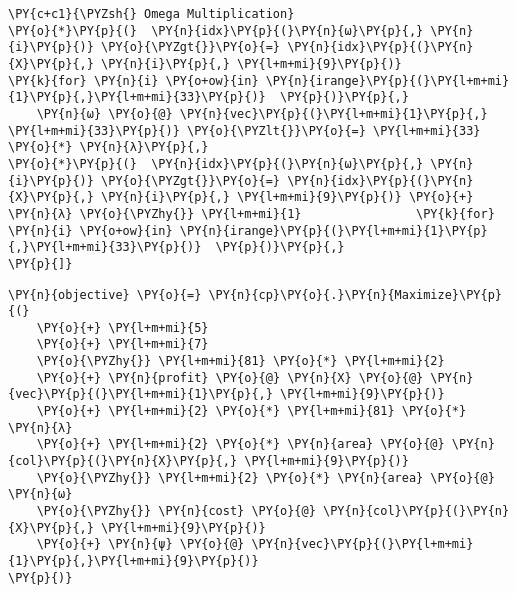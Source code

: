 \begin{tcolorbox}[breakable, size=fbox, boxrule=1pt, pad at break*=1mm,colback=cellbackground, colframe=cellborder]
\begin{Verbatim}[commandchars=\\\{\}]
    \PY{c+c1}{\PYZsh{} Omega Multiplication}
\PY{o}{*}\PY{p}{(}  \PY{n}{idx}\PY{p}{(}\PY{n}{ω}\PY{p}{,} \PY{n}{i}\PY{p}{)} \PY{o}{\PYZgt{}}\PY{o}{=} \PY{n}{idx}\PY{p}{(}\PY{n}{X}\PY{p}{,} \PY{n}{i}\PY{p}{,} \PY{l+m+mi}{9}\PY{p}{)}                        \PY{k}{for} \PY{n}{i} \PY{o+ow}{in} \PY{n}{irange}\PY{p}{(}\PY{l+m+mi}{1}\PY{p}{,}\PY{l+m+mi}{33}\PY{p}{)}  \PY{p}{)}\PY{p}{,}
    \PY{n}{ω} \PY{o}{@} \PY{n}{vec}\PY{p}{(}\PY{l+m+mi}{1}\PY{p}{,} \PY{l+m+mi}{33}\PY{p}{)} \PY{o}{\PYZlt{}}\PY{o}{=} \PY{l+m+mi}{33} \PY{o}{*} \PY{n}{λ}\PY{p}{,}
\PY{o}{*}\PY{p}{(}  \PY{n}{idx}\PY{p}{(}\PY{n}{ω}\PY{p}{,} \PY{n}{i}\PY{p}{)} \PY{o}{\PYZgt{}}\PY{o}{=} \PY{n}{idx}\PY{p}{(}\PY{n}{X}\PY{p}{,} \PY{n}{i}\PY{p}{,} \PY{l+m+mi}{9}\PY{p}{)} \PY{o}{+} \PY{n}{λ} \PY{o}{\PYZhy{}} \PY{l+m+mi}{1}                \PY{k}{for} \PY{n}{i} \PY{o+ow}{in} \PY{n}{irange}\PY{p}{(}\PY{l+m+mi}{1}\PY{p}{,}\PY{l+m+mi}{33}\PY{p}{)}  \PY{p}{)}\PY{p}{,}
\PY{p}{]}
    \end{Verbatim}
\end{tcolorbox}

\pagebreak

\begin{tcolorbox}[breakable, size=fbox, boxrule=1pt, pad at break*=1mm,colback=cellbackground, colframe=cellborder]
    \begin{Verbatim}[commandchars=\\\{\}]
\PY{n}{objective} \PY{o}{=} \PY{n}{cp}\PY{o}{.}\PY{n}{Maximize}\PY{p}{(}
    \PY{o}{+} \PY{l+m+mi}{5}
    \PY{o}{+} \PY{l+m+mi}{7}
    \PY{o}{\PYZhy{}} \PY{l+m+mi}{81} \PY{o}{*} \PY{l+m+mi}{2}
    \PY{o}{+} \PY{n}{profit} \PY{o}{@} \PY{n}{X} \PY{o}{@} \PY{n}{vec}\PY{p}{(}\PY{l+m+mi}{1}\PY{p}{,} \PY{l+m+mi}{9}\PY{p}{)}
    \PY{o}{+} \PY{l+m+mi}{2} \PY{o}{*} \PY{l+m+mi}{81} \PY{o}{*} \PY{n}{λ}
    \PY{o}{+} \PY{l+m+mi}{2} \PY{o}{*} \PY{n}{area} \PY{o}{@} \PY{n}{col}\PY{p}{(}\PY{n}{X}\PY{p}{,} \PY{l+m+mi}{9}\PY{p}{)}
    \PY{o}{\PYZhy{}} \PY{l+m+mi}{2} \PY{o}{*} \PY{n}{area} \PY{o}{@} \PY{n}{ω}
    \PY{o}{\PYZhy{}} \PY{n}{cost} \PY{o}{@} \PY{n}{col}\PY{p}{(}\PY{n}{X}\PY{p}{,} \PY{l+m+mi}{9}\PY{p}{)}
    \PY{o}{+} \PY{n}{ψ} \PY{o}{@} \PY{n}{vec}\PY{p}{(}\PY{l+m+mi}{1}\PY{p}{,}\PY{l+m+mi}{9}\PY{p}{)}
\PY{p}{)}
    \end{Verbatim}
\end{tcolorbox}

